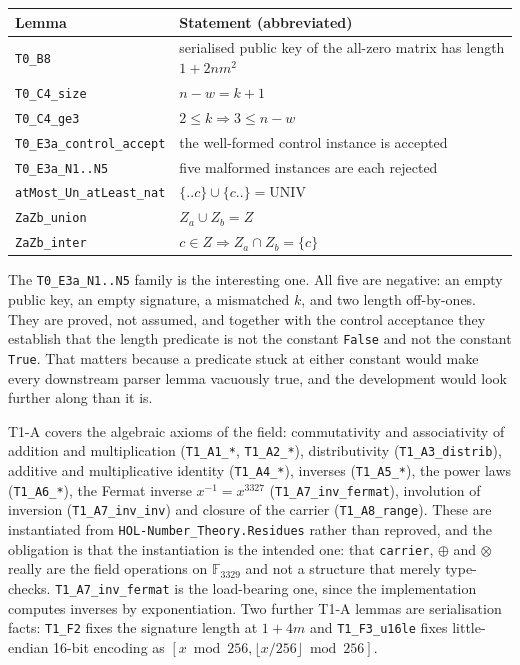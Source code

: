 \begin{center}
\begin{tabular}{@{}ll@{}}
\toprule
Lemma & Statement (abbreviated) \\
\midrule
\texttt{T0\_B8} & serialised public key of the all-zero matrix has length $1 + 2nm^2$ \\
\texttt{T0\_C4\_size} & $n - w = k + 1$ \\
\texttt{T0\_C4\_ge3} & $2 \le k \Rightarrow 3 \le n - w$ \\
\texttt{T0\_E3a\_control\_accept} & the well-formed control instance is accepted \\
\texttt{T0\_E3a\_N1..N5} & five malformed instances are each rejected \\
\texttt{atMost\_Un\_atLeast\_nat} & $\{..c\} \cup \{c..\} = \mathrm{UNIV}$ \\
\texttt{ZaZb\_union} & $Z_a \cup Z_b = Z$ \\
\texttt{ZaZb\_inter} & $c \in Z \Rightarrow Z_a \cap Z_b = \{c\}$ \\
\bottomrule
\end{tabular}
\end{center}

The \texttt{T0\_E3a\_N1..N5} family is the interesting one. All five are
negative: an empty public key, an empty signature, a mismatched $k$, and two
length off-by-ones. They are proved, not assumed, and together with the control
acceptance they establish that the length predicate is not the constant
\texttt{False} and not the constant \texttt{True}. That matters because a
predicate stuck at either constant would make every downstream parser lemma
vacuously true, and the development would look further along than it is.

T1-A covers the algebraic axioms of the field: commutativity and associativity
of addition and multiplication (\texttt{T1\_A1\_*}, \texttt{T1\_A2\_*}),
distributivity (\texttt{T1\_A3\_distrib}), additive and multiplicative identity
(\texttt{T1\_A4\_*}), inverses (\texttt{T1\_A5\_*}), the power laws
(\texttt{T1\_A6\_*}), the Fermat inverse $x^{-1} = x^{3327}$
(\texttt{T1\_A7\_inv\_fermat}), involution of inversion
(\texttt{T1\_A7\_inv\_inv}) and closure of the carrier
(\texttt{T1\_A8\_range}). These are instantiated from
\texttt{HOL-Number\_Theory.Residues} rather than reproved, and the obligation is
that the instantiation is the intended one: that \texttt{carrier},
$\oplus$ and $\otimes$ really are the field operations on $\mathbb{F}_{3329}$ and
not a structure that merely type-checks. \texttt{T1\_A7\_inv\_fermat} is the
load-bearing one, since the implementation computes inverses by exponentiation.
Two further T1-A lemmas are serialisation facts: \texttt{T1\_F2} fixes the
signature length at $1 + 4m$ and \texttt{T1\_F3\_u16le} fixes little-endian
16-bit encoding as $[x \bmod 256, \lfloor x/256 \rfloor \bmod 256]$.

